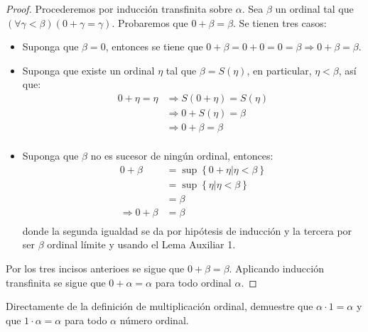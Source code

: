 \documentclass[12pt]{article}
\newcounter{it}
\theoremstyle{largebreak}
\begin{document}
    \begin{proof}
        Procederemos por inducción transfinita sobre $\alpha$. Sea $\beta$ un ordinal tal que $(\forall\gamma<\beta)(0+\gamma=\gamma)$. Probaremos que $0+\beta=\beta$. Se tienen tres casos:
        \begin{itemize}
            \item Suponga que $\beta=0$, entonces se tiene que $0+\beta=0+0=0=\beta\Rightarrow 0+\beta=\beta$.
            \item Suponga que existe un ordinal $\eta$ tal que $\beta=S(\eta)$, en particular, $\eta<\beta$, así que:
            \begin{equation*}
                \begin{split}
                    0+\eta=\eta&\Rightarrow S(0+\eta)=S(\eta)\\
                    &\Rightarrow 0+S(\eta)=\beta\\
                    &\Rightarrow0+\beta=\beta\\
                \end{split}
            \end{equation*}
            \item Suponga que $\beta$ no es sucesor de ningún ordinal, entonces:
            \begin{equation*}
                \begin{split}
                    0+\beta&=\sup\left\{0+\eta\Big|\eta<\beta \right\}\\
                    &=\sup\left\{\eta\Big|\eta<\beta \right\}\\
                    &=\beta\\
                    \Rightarrow 0+\beta&=\beta\\
                \end{split}
            \end{equation*}
            donde la segunda igualdad se da por hipótesis de inducción y la tercera por ser $\beta$ ordinal límite y usando el Lema Auxiliar 1.
        \end{itemize}
        Por los tres incisos anterioes se sigue que $0+\beta=\beta$. Aplicando inducción transfinita se sigue que $0+\alpha=\alpha$ para todo ordinal $\alpha$.
    \end{proof}

    \begin{excer}
        Directamente de la definición de multiplicación ordinal, demuestre que $\alpha\cdot1=\alpha$ y que $1\cdot\alpha=\alpha$ para todo $\alpha$ número ordinal.
    \end{excer}
\end{document}
